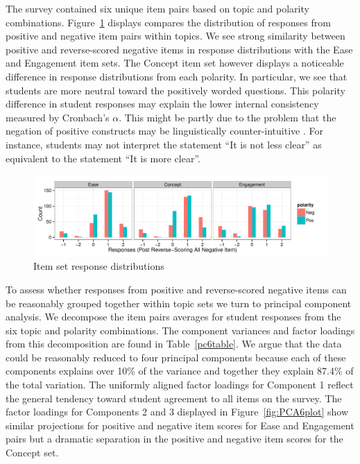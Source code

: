\documentclass{article}\usepackage[]{graphicx}\usepackage[]{color}
\newenvironment{knitrout}{}{} %
\begin{document}
The survey contained six unique item pairs based on topic and polarity combinations. Figure~\ref{fig:OverallSetBars} displays compares the distribution of responses from positive and negative item pairs within topics.  We see strong similarity between positive and reverse-scored negative items in response distributions with the Ease and Engagement item sets. The Concept item set however displays a noticeable difference in response distributions from each polarity.  In particular, we see that students are more neutral toward the positively worded questions. This polarity difference in student responses may explain the lower internal consistency measured by Cronbach's $\alpha$. This might be partly due to the problem that the negation of positive constructs may be linguistically counter-intuitive \citep{Friborg2006}. For instance, students may not interpret the statement ``It is not less clear'' as equivalent to the statement ``It is more clear''.  

\begin{knitrout}
\color{fgcolor}\begin{figure}[hbt]


{\centering \includegraphics[width=.8\linewidth]{figure/OverallSetBars-1} 

}

\caption[Item set response distributions]{Item set response distributions\label{fig:OverallSetBars}}
\end{figure}


\end{knitrout}


To assess whether responses from positive and reverse-scored negative items can be reasonably grouped together within topic sets we turn to principal component analysis.  We decompose the item pairs averages for student responses from the six topic and polarity combinations. The component variances and factor loadings from this decomposition are found in Table~\ref{pc6table}. We argue that the data could be reasonably reduced to four principal components because each of these components explains over 10\% of the variance and together they explain 87.4\% of the total variation.  The uniformly aligned factor loadings for Component 1 reflect the general tendency toward student agreement to all items on the survey.  The factor loadings for Components 2 and 3 displayed in Figure~\ref{fig:PCA6plot} show similar projections for positive and negative item scores for Ease and Engagement pairs but a dramatic separation in the positive and negative item scores for the Concept set.  \\  
\end{document}

